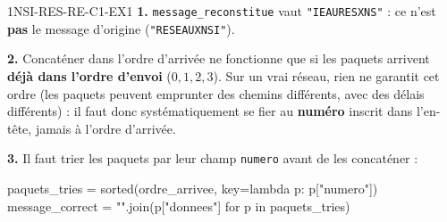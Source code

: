 \begin{corrige}{1NSI-RES-RE-C1-EX1}
\textbf{1.} \lstinline{message_reconstitue} vaut \lstinline{"IEAURESXNS"} : ce n'est
\textbf{pas} le message d'origine (\lstinline{"RESEAUXNSI"}).

\textbf{2.} Concaténer dans l'ordre d'arrivée ne fonctionne que si les paquets arrivent
\textbf{déjà dans l'ordre d'envoi} ($0,1,2,3$). Sur un vrai réseau, rien ne garantit cet
ordre (les paquets peuvent emprunter des chemins différents, avec des délais différents) :
il faut donc systématiquement se fier au \textbf{numéro} inscrit dans l'en-tête, jamais à
l'ordre d'arrivée.

\textbf{3.} Il faut trier les paquets par leur champ \lstinline{numero} avant de les
concaténer :
\begin{python}
paquets_tries = sorted(ordre_arrivee, key=lambda p: p["numero"])
message_correct = "".join(p["donnees"] for p in paquets_tries)
\end{python}
\end{corrige}
